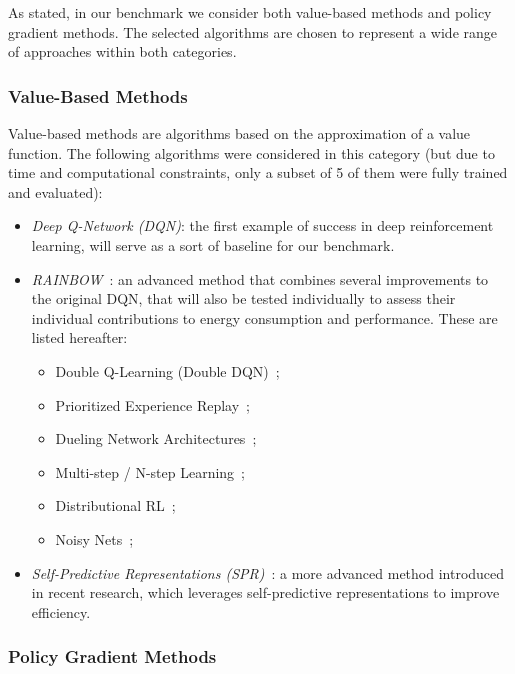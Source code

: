 As stated, in our benchmark we consider both value-based methods and policy gradient methods. The selected algorithms are chosen to represent a wide range of approaches within both categories.

\subsubsection{Value-Based Methods}

Value-based methods are algorithms based on the approximation of a value function. The following algorithms were considered in this category (but due to time and computational constraints, only a subset of 5 of them were fully trained and evaluated):

\begin{itemize}
	\item \textit{Deep Q-Network (DQN)}: the first example of success in deep reinforcement learning, will serve as a sort of baseline for our benchmark.
	\item \textit{RAINBOW}~\cite{hessel:rainbow}: an advanced method that combines several improvements to the original DQN, that will also be tested individually to assess their individual contributions to energy consumption and performance. These are listed hereafter:
	\begin{itemize}
		\item Double Q-Learning (Double DQN)~\cite{van:double_q};
		\item Prioritized Experience Replay~\cite{schaul:prioritized};
		\item Dueling Network Architectures~\cite{wang:dueling};
		\item Multi-step / N-step Learning~\cite{peng:incremental};
		\item Distributional RL~\cite{bellemare:distributional};
		\item Noisy Nets~\cite{fortunato:noisy};
	\end{itemize}
	\item \textit{Self-Predictive Representations (SPR)}~\cite{schwarzer:spr}: a more advanced method introduced in recent research, which leverages self-predictive representations to improve efficiency.
\end{itemize}

\subsubsection{Policy Gradient Methods}

